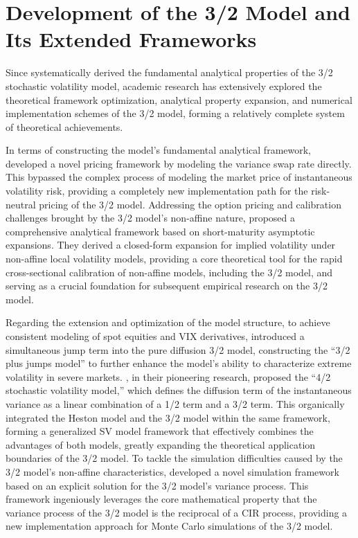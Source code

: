 \section{Development of the 3/2 Model and Its Extended Frameworks}

Since \citet{lewisOptionValuationStochastic2000} systematically derived the fundamental analytical properties of the 3/2 stochastic volatility model, academic research has extensively explored the theoretical framework optimization, analytical property expansion, and numerical implementation schemes of the 3/2 model, forming a relatively complete system of theoretical achievements.

In terms of constructing the model's fundamental analytical framework, \citet{carrNewApproachOption2007} developed a novel pricing framework by modeling the variance swap rate directly. This bypassed the complex process of modeling the market price of instantaneous volatility risk, providing a completely new implementation path for the risk-neutral pricing of the 3/2 model. Addressing the option pricing and calibration challenges brought by the 3/2 model's non-affine nature, \citet{medvedevApproximationCalibrationShortTerm2007} proposed a comprehensive analytical framework based on short-maturity asymptotic expansions. They derived a closed-form expansion for implied volatility under non-affine local volatility models, providing a core theoretical tool for the rapid cross-sectional calibration of non-affine models, including the 3/2 model, and serving as a crucial foundation for subsequent empirical research on the 3/2 model.

Regarding the extension and optimization of the model structure, to achieve consistent modeling of spot equities and VIX derivatives, \citet{baldeauxConsistentModelingVIX2012} introduced a simultaneous jump term into the pure diffusion 3/2 model, constructing the ``3/2 plus jumps model'' to further enhance the model's ability to characterize extreme volatility in severe markets. \citet{grasselli42Stochastic2017}, in their pioneering research, proposed the ``4/2 stochastic volatility model,'' which defines the diffusion term of the instantaneous variance as a linear combination of a 1/2 term and a 3/2 term. This organically integrated the Heston model and the 3/2 model within the same framework, forming a generalized SV model framework that effectively combines the advantages of both models, greatly expanding the theoretical application boundaries of the 3/2 model. To tackle the simulation difficulties caused by the 3/2 model's non-affine characteristics, \citet{kouarfateExplicitSolutionSimulation2021} developed a novel simulation framework based on an explicit solution for the 3/2 model's variance process. This framework ingeniously leverages the core mathematical property that the variance process of the 3/2 model is the reciprocal of a CIR process, providing a new implementation approach for Monte Carlo simulations of the 3/2 model.

